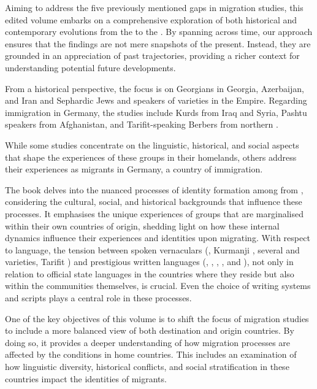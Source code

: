 \documentclass[output=paper,colorlinks,citecolor=brown]{langscibook}
\begin{document}
Aiming to address the five previously mentioned gaps in migration studies, this edited volume embarks on a comprehensive exploration of both historical and contemporary evolutions from the  to the  . By spanning across time, our approach ensures that the findings are not mere snapshots of the present. Instead, they are grounded in an appreciation of past trajectories, providing a richer context for understanding potential future developments. 

From a historical perspective, the focus is on Georgians in Georgia, Azerbaijan, and Iran and Sephardic Jews and speakers of  varieties in the  Empire. Regarding immigration in Germany, the studies include Kurds from Iraq and Syria, Pashtu speakers from Afghanistan, and Tarifit-speaking Berbers from northern .

While some studies concentrate on the linguistic, historical, and social aspects that shape the experiences of these  groups in their homelands, others address their experiences as migrants in Germany, a country of immigration.

The book delves into the nuanced processes of identity formation among  from , considering the cultural, social, and historical backgrounds that influence these processes. It emphasises the unique experiences of  groups that are marginalised within their own countries of origin, shedding light on how these internal dynamics influence their experiences and identities upon migrating. With respect to language, the tension between spoken vernaculars (, Kurmanji , several  and  varieties, Tarifit ) and prestigious written languages (, , , , and ), not only in relation to official state languages in the countries where they reside but also within the communities themselves, is crucial. Even the choice of writing systems and scripts plays a central role in these processes.

One of the key objectives of this volume is to shift the focus of migration studies to include a more balanced view of both destination and origin countries. By doing so, it provides a deeper understanding of how migration processes are affected by the conditions in home countries. This includes an examination of how linguistic diversity, historical conflicts, and social stratification in these countries impact the identities of migrants.
\end{document}
